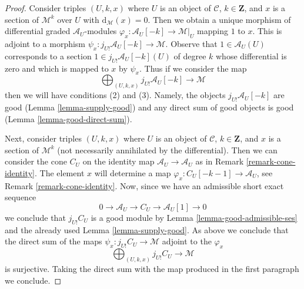 \documentclass[10pt,a4paper]{amsart}
\theoremstyle{plain}
\theoremstyle{definition}
\theoremstyle{remark}
\numberwithin{equation}{subsection}
\begin{document}
\begin{proof}
Consider triples $(U, k, x)$ where $U$ is an object of $\mathcal{C}$,
$k \in \mathbf{Z}$, and $x$ is a section of $\mathcal{M}^k$ over $U$
with $\text{d}_\mathcal{M}(x) = 0$. Then we obtain a unique morphism
of differential graded $\mathcal{A}_U$-modules
$\varphi_x : \mathcal{A}_U[-k] \to \mathcal{M}|_U$
mapping $1$ to $x$. This is adjoint to a morphism
$\psi_x : j_{U!}\mathcal{A}_U[-k] \to \mathcal{M}$.
Observe that $1 \in \mathcal{A}_U(U)$ corresponds to
a section $1 \in j_{U!}\mathcal{A}_U[-k](U)$ of degree $k$
whose differential is zero and which is mapped to $x$ by $\psi_x$.
Thus if we consider the map
$$
\bigoplus\nolimits_{(U, k, x)} j_{U!}\mathcal{A}_U[-k]
\longrightarrow
\mathcal{M}
$$
then we will have conditions (2) and (3). Namely, the objects
$j_{U!}\mathcal{A}_U[-k]$ are good (Lemma \ref{lemma-supply-good})
and any direct sum of good objects is good (Lemma \ref{lemma-good-direct-sum}).

\medskip\noindent
Next, consider triples $(U, k, x)$ where $U$ is an object of $\mathcal{C}$,
$k \in \mathbf{Z}$, and $x$ is a section of $\mathcal{M}^k$ (not necessarily
annihilated by the differential). Then we can consider
the cone $C_U$ on the identity map $\mathcal{A}_U \to \mathcal{A}_U$
as in Remark \ref{remark-cone-identity}. The element $x$ will determine a map
$\varphi_x : C_U[-k - 1] \to \mathcal{A}_U$, see
Remark \ref{remark-cone-identity}. Now, since we have
an admissible short exact sequence
$$
0 \to \mathcal{A}_U \to C_U \to \mathcal{A}_U[1] \to 0
$$
we conclude that $j_{U!}C_U$ is a good module by
Lemma \ref{lemma-good-admissible-ses} and
the already used Lemma \ref{lemma-supply-good}.
As above we conclude that the direct sum of the maps
$\psi_x : j_{U!}C_U \to \mathcal{M}$ adjoint to the $\varphi_x$
$$
\bigoplus\nolimits_{(U, k, x)} j_{U!}C_U \longrightarrow \mathcal{M}
$$
is surjective. Taking the direct sum with the map produced
in the first paragraph we conclude.
\end{proof}
\end{document}
